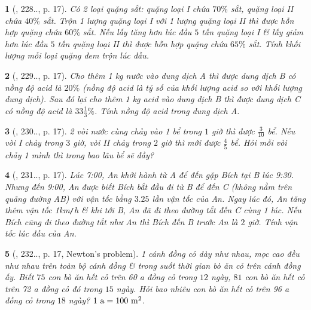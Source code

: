 \documentclass{article}
\newtheorem{baitoan}{}
\begin{document}
\begin{baitoan}[\cite{Binh_Toan_9_tap_2}, 228.., p. 17]
	Có 2 loại quặng sắt: quặng loại I chứa $70\%$ sắt, quặng loại II chứa $40\%$ sắt. Trộn 1 lượng quặng loại I với 1 lượng quặng loại II thì được hỗn hợp quặng chứa $60\%$ sắt. Nếu lấy tăng hơn lúc đầu $5$ tấn quặng loại I \& lấy giảm hơn lúc đầu $5$ tấn quặng loại II thì được hỗn hợp quặng chứa $65\%$ sắt. Tính khối lượng mỗi loại quặng đem trộn lúc đầu.
\end{baitoan}

\begin{baitoan}[\cite{Binh_Toan_9_tap_2}, 229.., p. 17]
	Cho thêm {\rm1 kg} nước vào dung dịch A thì được dung dịch B có nồng độ acid là $20\%$ (nồng độ acid là tỷ số của khối lượng acid so với khối lượng dung dịch). Sau đó lại cho thêm {\rm1 kg} acid vào dung dịch B thì được dung dịch C có nồng độ acid là $33\frac{1}{3}\%$. Tính nồng độ acid trong dung dịch A.
\end{baitoan}

\begin{baitoan}[\cite{Binh_Toan_9_tap_2}, 230.., p. 17]
	2 vòi nước cùng chảy vào 1 bể trong $1$ giờ thì được $\frac{3}{10}$ bể. Nếu vòi I chảy trong $3$ giờ, vòi II chảy trong $2$ giờ thì mới được $\frac{4}{5}$ bể. Hỏi mỗi vòi chảy 1 mình thì trong bao lâu bể sẽ đầy?
\end{baitoan}

\begin{baitoan}[\cite{Binh_Toan_9_tap_2}, 231.., p. 17]
	Lúc {\rm7:00}, An khởi hành từ A để đến gặp Bích tại B lúc {\rm9:30}. Nhưng đến {\rm9:00}, An được biết Bích bắt đầu đi từ B để đến C (không nằm trên quãng đường AB) với vận tốc bằng $3.25$ lần vận tốc của An. Ngay lúc đó, An tăng thêm vận tốc {\rm1km{\tt/}h} \& khi tới B, An đã đi theo đường tắt đến C cùng 1 lúc. Nếu Bích cũng đi theo đường tắt như An thì Bích đến B trước An là $2$ giờ. Tính vận tốc lúc đầu của An.
\end{baitoan}

\begin{baitoan}[\cite{Binh_Toan_9_tap_2}, 232.., p. 17, Newton's problem]
	1 cánh đồng cỏ dày như nhau, mọc cao đều như nhau trên toàn bộ cánh đồng \& trong suốt thời gian bò ăn cỏ trên cánh đồng ấy. Biết $75$ con bò ăn hết cỏ trên {\rm60 a} đồng cỏ trong $12$ ngày, $81$ con bò ăn hết cỏ trên {\rm72 a} đồng cỏ đó trong $15$ ngày. Hỏi bao nhiêu con bò ăn hết cỏ trên {\rm96 a} đồng cỏ trong $18$ ngày? $\rm1\ a = 100\ m^2$.
\end{baitoan}
\end{document}
